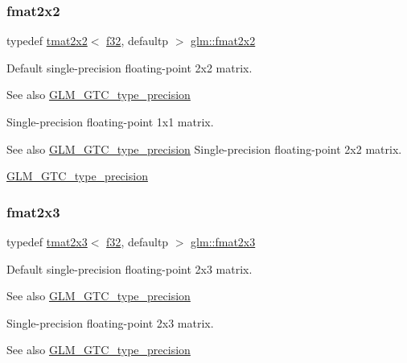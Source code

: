 \subsubsection{\texorpdfstring{fmat2x2}{fmat2x2}}
{\footnotesize\ttfamily typedef \hyperlink{structglm_1_1tmat2x2}{tmat2x2}$<$ \hyperlink{group__gtc__type__precision_ga0ec999b57f5330d9021256e96038df04}{f32}, defaultp $>$ \hyperlink{group__gtc__type__precision_ga20fdbcc6b16bed27ad25db9b71d09e93}{glm\+::fmat2x2}}

Default single-\/precision floating-\/point 2x2 matrix. \begin{DoxySeeAlso}{See also}
\hyperlink{group__gtc__type__precision}{G\+L\+M\+\_\+\+G\+T\+C\+\_\+type\+\_\+precision}
\end{DoxySeeAlso}
Single-\/precision floating-\/point 1x1 matrix. \begin{DoxySeeAlso}{See also}
\hyperlink{group__gtc__type__precision}{G\+L\+M\+\_\+\+G\+T\+C\+\_\+type\+\_\+precision} Single-\/precision floating-\/point 2x2 matrix. 

\hyperlink{group__gtc__type__precision}{G\+L\+M\+\_\+\+G\+T\+C\+\_\+type\+\_\+precision} 
\end{DoxySeeAlso}
\mbox{\label{group__gtc__type__precision_ga80f463bcb7e5008c11af5fdbc52c0045}} 
\subsubsection{\texorpdfstring{fmat2x3}{fmat2x3}}
{\footnotesize\ttfamily typedef \hyperlink{structglm_1_1tmat2x3}{tmat2x3}$<$ \hyperlink{group__gtc__type__precision_ga0ec999b57f5330d9021256e96038df04}{f32}, defaultp $>$ \hyperlink{group__gtc__type__precision_ga80f463bcb7e5008c11af5fdbc52c0045}{glm\+::fmat2x3}}

Default single-\/precision floating-\/point 2x3 matrix. \begin{DoxySeeAlso}{See also}
\hyperlink{group__gtc__type__precision}{G\+L\+M\+\_\+\+G\+T\+C\+\_\+type\+\_\+precision}
\end{DoxySeeAlso}
Single-\/precision floating-\/point 2x3 matrix. \begin{DoxySeeAlso}{See also}
\hyperlink{group__gtc__type__precision}{G\+L\+M\+\_\+\+G\+T\+C\+\_\+type\+\_\+precision} 
\end{DoxySeeAlso}
\mbox{\label{group__gtc__type__precision_ga76578ee3c2d6de9b46d0efd1c7060b85}} 
